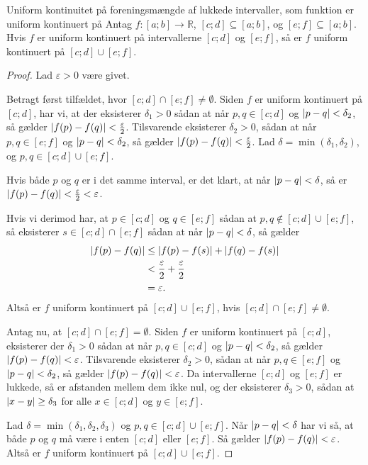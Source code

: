 \begin{theorem}[label=theo:uniform_fælles]{Uniform kontinuitet på foreningsmængde af lukkede intervaller, som funktion er uniform kontinuert på}{}
  Antag $f:[a;b]\to \mathbb{R}$, $[c;d] \subseteq [a;b]$, og $[e;f]\subseteq [a;b]$.
  Hvis $f$ er uniform kontinuert på intervallerne $[c;d]$ og $[e;f]$, så er $f$ uniform kontinuert på $[c;d] \cup [e;f]$.
\end{theorem}
\begin{proof} 
  Lad $\varepsilon >0$ være givet. 

  Betragt først tilfældet, hvor $[c;d]\cap [e;f]\neq \emptyset $.
  Siden $f$ er uniform kontinuert på $[c;d]$, har vi, at der eksisterer $\delta _1>0$ sådan at når $p, q \in [c;d]$ og $\abs{p-q} <\delta _2$, så gælder $\abs{f(p)-f(q)} < \frac{\varepsilon }{2} $. 
  Tilsvarende eksisterer $\delta _2>0$, sådan at når $p, q \in [e;f]$ og $\abs{p-q} < \delta _2 $, så gælder $\abs{f(p)-f(q)} <\frac{\varepsilon }{2}$. 
  Lad $\delta =\min (\delta _1, \delta _2)$, og $p, q \in [c;d] \cup [e;f]$.

  \noindent Hvis både $p$ og $q$ er i det samme interval, er det klart, at når $\abs{p-q}<\delta  $, så er $\abs{f(p)-f(q)} <\frac{\varepsilon }{2} < \varepsilon  $. 

  \noindent Hvis vi derimod har, at $p \in [c;d]$ og $q \in [e;f]$ sådan at $p, q \not\in [c;d] \cup [e;f]$, så eksisterer $s \in [c;d] \cap [e;f]$ sådan at når $\abs{p-q} <\delta $, så gælder
  \begin{equation*}
  \begin{split}
 \abs{f(p)-f(q)} &\leq \abs{f(p)-f(s)} + \abs{f(q)-f(s)} \\
  &< \frac{\varepsilon }{2} + \frac{\varepsilon }{2} \\
  &=\varepsilon.
  \end{split}
  \end{equation*}
  Altså er $f$ uniform kontinuert på $[c;d] \cup [e;f]$, hvis $[c;d] \cap [e;f]\neq \emptyset $.

  Antag nu, at $[c;d] \cap [e;f] = \emptyset $.
Siden $f$ er uniform kontinuert på $[c;d]$, eksisterer der $\delta _1>0$ sådan at når $p, q \in [c;d]$ og $\abs{p-q} <\delta _2$, så gælder $\abs{f(p)-f(q)} < \varepsilon$.
Tilsvarende eksisterer $\delta _2>0$, sådan at når $p, q \in [e;f]$ og $\abs{p-q} < \delta _2 $, så gælder $\abs{f(p)-f(q)} <\varepsilon$. 
  Da intervallerne $[c;d]$ og $[e;f]$ er lukkede, så er afstanden mellem dem ikke nul, og der eksisterer $\delta _3>0$, sådan at $\abs{x-y}\geq \delta _3$ for alle $x \in [c;d]$ og $y \in [e;f]$.

  \noindent Lad $\delta = \min (\delta _1, \delta _2, \delta _3)$ og $p, q \in [c;d] \cup [e;f]$.
  Når $\abs{p-q} <\delta $ har vi så, at både $p$ og $q$ må være i enten $[c;d]$ eller $[e;f]$.
  Så gælder $\abs{f(p)-f(q)} <\varepsilon $.
  Altså er $f$ uniform kontinuert på $[c;d] \cup [e;f]$. 


\end{proof}


